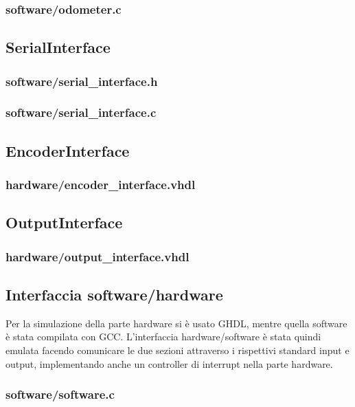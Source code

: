\documentclass [11pt,a4paper,oneside]{paper}
\newcommand{\inputVHDL}[1]{}
\newcommand{\inputC}[1]{}
\begin{document}
\subsubsection{software/odometer.c}
\inputC{software/odometer.c}

\subsection{SerialInterface}
\subsubsection{software/serial\_interface.h}
\inputC{software/serial_interface.h}
\subsubsection{software/serial\_interface.c}
\inputC{software/serial_interface.c}

\subsection{EncoderInterface}
\subsubsection{hardware/encoder\_interface.vhdl}
\inputVHDL{hardware/encoder_interface.vhdl}

\subsection{OutputInterface}
\subsubsection{hardware/output\_interface.vhdl}
\inputVHDL{hardware/output_interface.vhdl}

\subsection{Interfaccia software/hardware}
Per la simulazione della parte hardware si è usato GHDL, mentre quella software
è stata compilata con GCC. L'interfaccia hardware/software è stata quindi emulata
facendo comunicare le due sezioni attraverso i rispettivi standard input e output,
implementando anche un controller di interrupt nella parte hardware.

\subsubsection{software/software.c}
\inputC{software/software.c}
\end{document}
